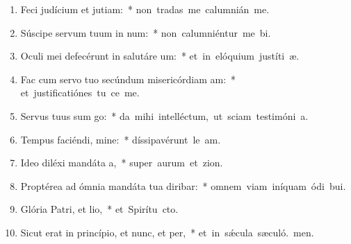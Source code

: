 \begin{flushleft}
\begin{enumerate}[leftmargin=*]

\item Feci judícium et jutiam:~* \mbox{non tradas me calumnián me.}
\item Súscipe servum tuum in num:~* \mbox{non calumniéntur me bi.}
\item Oculi mei defecérunt in salutáre um:~* \mbox{et in elóquium justíti æ.}
\item Fac cum servo tuo secúndum misericórdiam am:~* \mbox{et justificatiónes tu ce me.}
\item Servus tuus sum go:~* \mbox{da mihi intelléctum, ut sciam testimóni a.}
\item Tempus faciéndi, mine:~* \mbox{díssipavérunt le am.}
\item Ideo diléxi mandáta a,~* \mbox{super aurum et zion.}
\item Proptérea ad ómnia mandáta tua diribar:~* \mbox{omnem viam iníquam ódi bui.}
\item Glória Patri, et lio,~* \mbox{et Spirítu cto.}
\item Sicut erat in princípio, et nunc, et per,~* \mbox{et in s\'{\ae}cula sæculó. men.}

\end{enumerate}
\end{flushleft}

